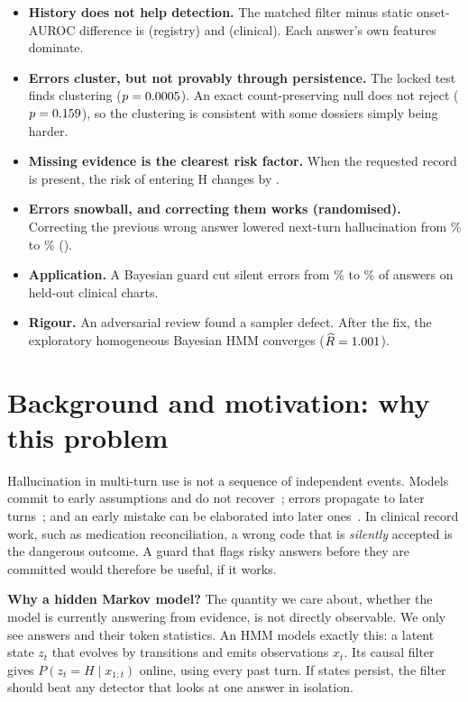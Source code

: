 \documentclass[11pt]{article}
\begin{document}
\begin{itemize}[leftmargin=*]
\item \textbf{History does not help detection.} The matched filter minus static onset-AUROC difference is \PrimRegL{} (registry) and \PrimClinL{} (clinical). Each answer's own features dominate.
\item \textbf{Errors cluster, but not provably through persistence.} The locked test finds clustering ($p=0.0005$). An exact count-preserving null does not reject ($p=0.159$), so the clustering is consistent with some dossiers simply being harder.
\item \textbf{Missing evidence is the clearest risk factor.} When the requested record is present, the risk of entering H changes by \EvidRegX{}.
\item \textbf{Errors snowball, and correcting them works (randomised).} Correcting the previous wrong answer lowered next-turn hallucination from \OrigHReg\% to \CorrHReg\% (\CorrReg).
\item \textbf{Application.} A Bayesian guard cut silent errors from \GuardSilentU\% to \GuardSilentG\% of answers on held-out clinical charts.
\item \textbf{Rigour.} An adversarial review found a sampler defect. After the fix, the exploratory homogeneous Bayesian HMM converges ($\widehat R=1.001$).
\end{itemize}

\section{Background and motivation: why this problem}
Hallucination in multi-turn use is not a sequence of independent events. Models commit to early assumptions and do not recover~\cite{laban}; errors propagate to later turns~\cite{halluhard}; and an early mistake can be elaborated into later ones~\cite{zhang}. In clinical record work, such as medication reconciliation, a wrong code that is \emph{silently} accepted is the dangerous outcome. A guard that flags risky answers before they are committed would therefore be useful, if it works.

\textbf{Why a hidden Markov model?} The quantity we care about, whether the model is currently answering from evidence, is not directly observable. We only see answers and their token statistics. An HMM models exactly this: a latent state $z_t$ that evolves by transitions and emits observations $x_t$. Its causal filter gives $P(z_t=H\mid x_{1:t})$ online, using every past turn. If states persist, the filter should beat any detector that looks at one answer in isolation.
\end{document}
